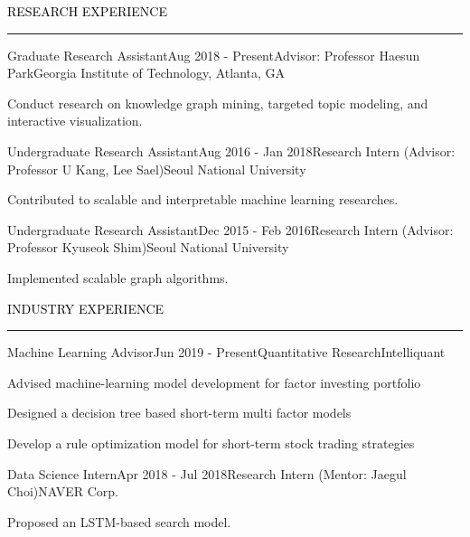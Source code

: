 \documentclass{resume} %
\renewenvironment{rSection}[1]{
	\sectionskip
	\textcolor{Black}{\MakeUppercase{#1}}
	\sectionlineskip
	\hrule
	\begin{list}{}{
			\setlength{\leftmargin}{1.5em}
		}
		\item[]
	}{
	\end{list}
}
\begin{document}
\vspace*{-1.0mm}
\begin{rSection}{Research Experience}
\begin{rSubsection}{Graduate Research Assistant}{Aug 2018 - Present}{Advisor: Professor Haesun Park}{Georgia Institute of Technology, Atlanta, GA}
	\item Conduct research on knowledge graph mining, targeted topic modeling, and interactive visualization.
\end{rSubsection}	
\vspace*{-2.5mm}
\begin{rSubsection}{Undergraduate Research Assistant}{Aug 2016 - Jan 2018}{Research Intern (Advisor: Professor U Kang, Lee Sael)}{Seoul National University}
	\item Contributed to scalable and interpretable machine learning researches.
\end{rSubsection}	
\vspace*{-2.5mm}
\begin{rSubsection}{Undergraduate Research Assistant}{Dec 2015 - Feb 2016}{Research Intern (Advisor: Professor Kyuseok Shim)}{Seoul National University}
	\item Implemented scalable graph algorithms.
\end{rSubsection}

\end{rSection}
\vspace{-3mm}


\vspace*{-1.0mm}
\begin{rSection}{Industry Experience}
\begin{rSubsection}{Machine Learning Advisor}{Jun 2019 - Present}{Quantitative Research}{Intelliquant}
	\item Advised machine-learning model development for factor investing portfolio
	\item Designed a decision tree based short-term multi factor models
	\item Develop a rule optimization model for short-term stock trading strategies
\end{rSubsection}	
\vspace*{-2.5mm}
\begin{rSubsection}{Data Science Intern}{Apr 2018 - Jul 2018}{Research Intern (Mentor: Jaegul Choi)}{NAVER Corp.}
	\item Proposed an LSTM-based search model.
\end{rSubsection}

\end{rSection}
\end{document}
